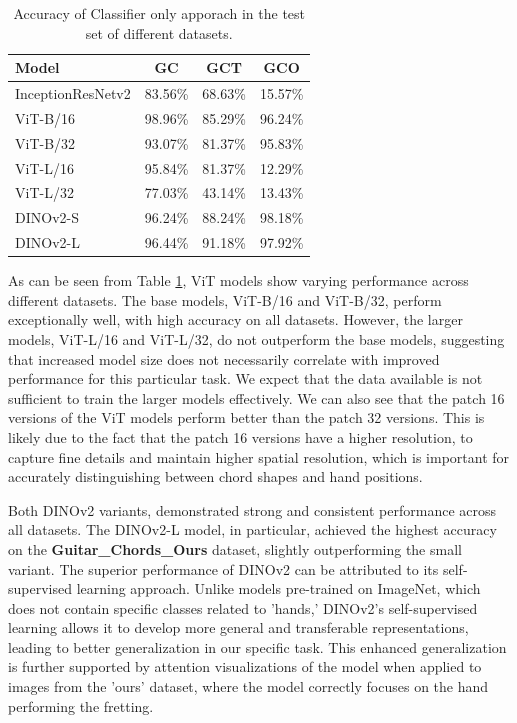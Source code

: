 \documentclass[10pt,twocolumn,letterpaper]{article}
\begin{document}
\begin{table}[h]
    \centering
    \begin{tabular}{lccc}
        \toprule
        \textbf{Model}    & \textbf{GC} & \textbf{GCT} & \textbf{GCO} \\
        \midrule
        InceptionResNetv2 & 83.56\%     & 68.63\%      & 15.57\%      \\
        \midrule
        ViT-B/16          & 98.96\%     & 85.29\%      & 96.24\%      \\
        ViT-B/32          & 93.07\%     & 81.37\%      & 95.83\%      \\
        ViT-L/16          & 95.84\%     & 81.37\%      & 12.29\%      \\
        ViT-L/32          & 77.03\%     & 43.14\%      & 13.43\%      \\
        DINOv2-S          & 96.24\%     & 88.24\%      & 98.18\%      \\
        DINOv2-L          & 96.44\%     & 91.18\%      & 97.92\%      \\
        \bottomrule
    \end{tabular}
    \caption{Accuracy of Classifier only apporach in the test set of different datasets.}
    \label{tab:transformer-models-results}
\end{table}

As can be seen from Table \ref{tab:transformer-models-results}, ViT models show varying performance across different datasets. The base models, ViT-B/16 and ViT-B/32, perform exceptionally well, with high accuracy on all datasets. However, the larger models, ViT-L/16 and ViT-L/32, do not outperform the base models, suggesting that increased model size does not necessarily correlate with improved performance for this particular task. We expect that the data available is not sufficient to train the larger models effectively. We can also see that the patch 16 versions of the ViT models perform better than the patch 32 versions. This is likely due to the fact that the patch 16 versions have a higher resolution, to capture fine details and maintain higher spatial resolution, which is important for accurately distinguishing between chord shapes and hand positions.

Both DINOv2 variants, demonstrated strong and consistent performance across all datasets. The DINOv2-L model, in particular, achieved the highest accuracy on the \textbf{Guitar\_Chords\_Ours} dataset, slightly outperforming the small variant. The superior performance of DINOv2 can be attributed to its self-supervised learning approach. Unlike models pre-trained on ImageNet, which does not contain specific classes related to 'hands,' DINOv2's self-supervised learning allows it to develop more general and transferable representations, leading to better generalization in our specific task. This enhanced generalization is further supported by attention visualizations of the model when applied to images from the 'ours' dataset, where the model correctly focuses on the hand performing the fretting.
\end{document}

